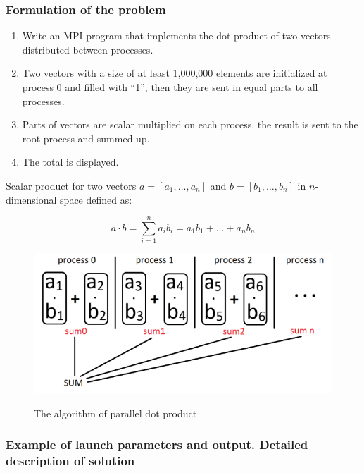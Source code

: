 \documentclass[%
12pt, %
final, %
oneside, %
onecolumn, %
centertags]{article} %
\theoremstyle{plain}
\theoremstyle{definition}
\theoremstyle{remark}
\begin{document}
\subsubsection{Formulation of the problem}

\begin{enumerate}
	\item Write an MPI program that implements the dot product of two vectors distributed between processes.
	\item Two vectors with a size of at least 1,000,000 elements are initialized at process $0$ and filled with “1”, then they are sent in equal parts to all processes. 
	\item Parts of vectors are scalar multiplied on each process, the result is sent to the root process and summed up.
	\item The total is displayed.
\end{enumerate}

Scalar product for two vectors $a = [a_1, \ldots, a_n]$ and $b = [b_1, \ldots, b_n]$ in $n$-dimensional space defined as:

$$a \cdot b = \sum\limits_{i=1}^n a_i b_i = a_1b_1 + \ldots + a_nb_n$$


\begin{figure}[h]
\begin{center}
\includegraphics[scale=1]{7_how_to_solve.png}

The algorithm of parallel dot product

\label{labl}
\end{center}
\end{figure}


\subsubsection{Example of launch parameters and output. Detailed description of solution}
\end{document}
